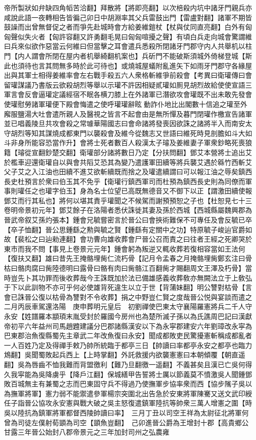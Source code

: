 帝所製狀如弁缺四角幍苦洽翻】拜散將【將即亮翻】以次棓殺内坑中諸牙門親兵亦咸說此語一夜轉相告皆徧己卯日中胡淵率其父兵雷鼓出門【雷盧對翻】諸軍不期皆鼓譟而出曾無督促之者而爭先赴城時會方給姜維鎧杖【杖與仗同直亮翻】白外有匈匈聲似失火者【匈許容翻又許勇翻毛晃曰匈匈喧擾之聲】有頃白兵走向城會驚謂維曰兵來似欲作惡當云何維曰但當擊之耳會遣兵悉殺所閉諸牙門郡守内人共舉机以柱門【内人謂會所閉在屋内者机舉綺翻机案也】兵斫門不能破斯須城外倚梯登城【斯此也須待也言其問無多時於此可待也】或燒城屋蟻附亂進矢下如雨牙門郡守各緣屋出與其軍士相得姜維率會左右戰手殺五六人衆格斬維爭前殺會【考異曰衛瓘傳曰會留瓘謀議乃書版云欲殺胡烈等舉以示瓘不許因相疑貳瓘如厠見胡烈故給使使宣語三軍言會反會逼瓘定議經宿不眠各横刀膝上在外諸軍已潛欲攻會瓘既不出未敢先發會使瓘慰勞諸軍瓘便下殿會悔遣之使呼瓘瓘辭眩動詐仆地比出閣數十信追之瓘至外廨服鹽湯大吐會遣所親人及醫視之皆言不起會由是無所憚及暮門閉瓘作檄宣告諸軍並已唱義陵旦共攻會殺之常璩華陽國志曰會命諸將發喪因欲誅之諸將半入而南安太守胡烈等知其謀燒成都東門以襲殺會及維今從魏志又世語曰維死時見剖膽如斗大如斗非身所能容恐當作升】會將士死者數百人殺漢太子璿及姜維妻子軍衆鈔略死喪狼籍【璿從宣翻鈔楚交翻】衛瓘部分諸將數日乃定【分扶問翻】鄧艾本營將士追出艾於檻車迎還衛瓘自以與會共䧟艾恐其為變乃遣護軍田續等將兵襲艾遇於緜竹西斬艾父子艾之入江油也田續不進艾欲斬續既而捨之及瓘遣續謂曰可以報江油之辱矣鎮西長史杜預言於衆曰伯玉其不免乎【衛瓘行鎮西軍司而杜預為鎮西長史則為同僚而軍事則瓘任之也瓘字伯玉】身為名士位望已高既無德音又不御下以正【謂激田續使報鄧艾而行其私也】將何以堪其責乎瓘聞之不候駕而謝預預恕之子也【杜恕見七十三卷明帝景初元年】鄧艾餘子在洛陽者悉伏誅徙其妻及孫於西城【西城縣屬魏興郡為晉武帝叙艾孫灼張本】鍾會兄毓嘗密言於晉公曰會挾術難保不可專任及會反毓已卒【卒子恤翻】晉公思鍾繇之勲與毓之賢【鍾繇有定關中之功】特原毓子峻辿官爵如故【裴松之曰辿勑連翻】會功曹向雄收葬會尸晉公召而責之曰往者王經之死卿哭於東市而我不問【事見上卷景元元年】鍾會躬為叛逆又輒收葬若復相容當如王法何【復扶又翻】雄曰昔先王掩骼埋胔仁流朽骨【記月令孟春之月掩骼埋胔鄭玄注曰骨枯曰骼肉腐曰胔陸德明曰露骨曰骼有肉曰胔骼江百翻胔才賜翻周文王澤及朽骨】當時豈先卜其功罪而後收葬哉今王誅既加於法已備雄感義收葬敎亦無闕法立于上敎弘于下以此訓物不亦可乎何必使雄背死違生以立于世【背蒲妹翻】明公讐對枯骨【言會已誅晉公復以枯骨為讐對不令收葬】捐之中野豈仁賢之度哉晉公悦與宴談而遣之　二月丙辰車駕還洛陽　庚申葬明元皇后　初劉禪使巴東太守襄陽羅憲將兵二千人守永安【姓譜羅本顓頊末胤受封於羅國今房州也為楚所滅子孫以為氏譙周巴記曰漢獻帝初平六年益州司馬趙韙建議分巴郡諸縣漢安以下為永寜郡建安六年劉璋改永寜為巴東郡治魚復縣蜀先主章武二年改魚復曰永安】聞成都敗吏民驚擾憲斬稱成都亂者一人百姓乃定及得禪手敕乃帥所統臨于都亭三日【帥讀曰率都亭永安之都亭也臨力鴆翻】吳聞蜀敗起兵西上【上時掌翻】外託救援内欲襲憲憲曰本朝傾覆【朝直遥翻】吳為唇齒不恤我難而背盟徼利【難乃旦翻徼一遥翻】不義甚矣且漢已亡吳何得久我寜能為吳降虜乎【降戶江翻】保城繕甲告誓將士厲以節義莫不憤激吳人聞鍾鄧敗百城無主有兼蜀之志而巴東固守兵不得過乃使撫軍步協率衆而西【協步隲子吳以為撫軍將軍】憲力弱不能禦遣參軍楊宗突圍北出告急於安東將軍陳騫又送文武印綬任子詣晉公協攻永安憲與戰大破之吳主怒復遣鎮軍陸抗等帥衆三萬人增憲之圍【時吳以陸抗為鎮軍將軍都督西陵帥讀曰率】　三月丁丑以司空王祥為太尉征北將軍何曾為司徒左僕射荀顗為司空【顗魚豈翻】　己卯進晉公爵為王增封十郡【高貴鄉公甘露三年晉公始封八郡帝景元之三年加封司州之弘農雍